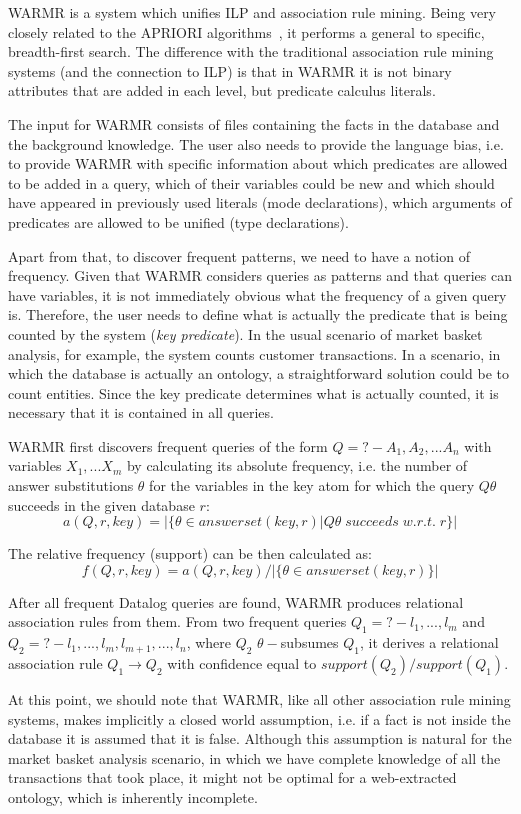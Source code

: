 WARMR\cite{DehToi99,DehToi00} is a system which unifies ILP and association rule mining. Being very closely related to the APRIORI algorithms~\cite{Agrawal:1996:FDA:257938.257975}, it performs a general to specific, breadth-first search. The difference with the traditional association rule mining systems (and the connection to ILP) is that in WARMR it is not binary attributes that are added in each level, but predicate calculus literals.

The input for WARMR consists of files containing the facts in the database and the background knowledge. The user also needs to provide the language bias, i.e. to provide WARMR with specific information about which predicates are allowed to be added in a query, which of their variables could be new and which should have appeared in previously used literals (mode declarations), which arguments of predicates are allowed to be unified (type declarations). 


Apart from that, to discover frequent patterns, we need to have a notion of frequency. Given that WARMR considers queries as patterns and that queries can have variables, it is not
immediately obvious what the frequency of a given query is. Therefore, the user needs to define what is actually the predicate that is being counted by the system (\textit{key predicate}). In the usual scenario of market basket analysis, for example, the system counts customer transactions. In a scenario, in which the database is actually an ontology, a straightforward solution could be to count entities. Since the key predicate determines what is actually counted, it is necessary that it is contained in all queries.  


WARMR first discovers frequent queries of the form $Q =?-A_1,A_2, . . . A_n$ with variables ${X_1, . . .X_m}$ by calculating its absolute frequency, i.e. the number of answer substitutions $\theta$ for the variables in the key atom for which the query $Q\theta$ succeeds in the given database $r$:
\[
a(Q, r, key) = |\{\theta \in answerset(key, r)|Q\theta \; succeeds \; w.r.t. \; r\}| 
\]


The relative frequency (support) can be then calculated as:
\[
 f(Q, r, key) = a(Q, r, key)/|\{\theta \in answerset(key, r)\}|
\]

After all frequent Datalog queries are found, WARMR produces relational association rules from them. From two frequent queries $Q_1=?-l_1,...,l_m$ and $Q_2=?-l_1,...,l_m,l_{m+1},...,l_n$, where $Q_2$ $\theta-$subsumes $Q_1$, it derives a relational association rule $Q_1 \rightarrow Q_2$ with confidence equal to $support(Q_2)/support(Q_1)$.

At this point, we should note that WARMR, like all other association rule mining systems, makes implicitly a closed world assumption, i.e. if a fact is not inside the database it is assumed that it is false. Although this assumption is natural for the market basket analysis scenario, in which we have complete knowledge of all the transactions that took place, it might not be optimal for a web-extracted ontology, which is inherently incomplete.